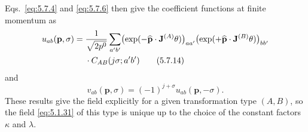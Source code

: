 Eqs.~\eqref{eq:5.7.4} and \eqref{eq:5.7.6} then give the coefficient functions at finite
momentum as
\begin{align}
u_{ab}(\mathbf p,\sigma)={}&\frac{1}{\sqrt{2p^0}}
\sum_{a'b'}
\bigl(\exp(-\widehat{\mathbf p}\cdot\mathbf J^{(A)}\theta)\bigr)_{aa'}
\bigl(\exp(+\widehat{\mathbf p}\cdot\mathbf J^{(B)}\theta)\bigr)_{bb'}
\notag\\
&\cdot C_{AB}(j\sigma;a'b')
\tag{5.7.14}\label{eq:5.7.14}
\end{align}
and
\begin{equation}
v_{ab}(\mathbf p,\sigma)=(-1)^{j+\sigma}u_{ab}(\mathbf p,-\sigma).
\tag{5.7.15}\label{eq:5.7.15}
\end{equation}
These results give the field explicitly for a given transformation type
$(A,B)$, so the field \eqref{eq:5.1.31} of this type is unique up to the choice of the
constant factors $\kappa$ and $\lambda$.

